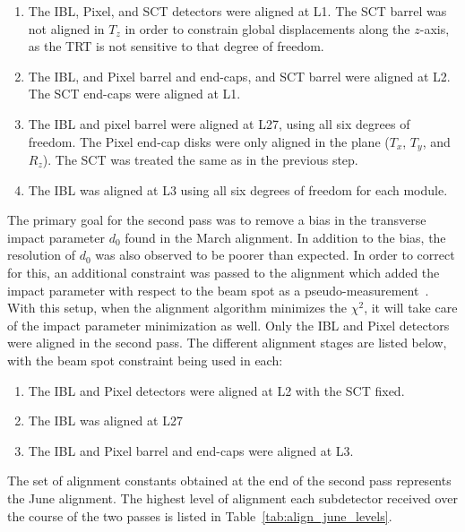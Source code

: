 \begin{enumerate}
\item The IBL, Pixel, and SCT detectors were aligned at L1.  The SCT barrel was not aligned in $T_z$ in order to constrain global displacements along the $z$-axis, as the TRT is not sensitive to that degree of freedom.
\item The IBL, and Pixel barrel and end-caps, and SCT barrel were aligned at L2.  The SCT end-caps were aligned at L1.
\item The IBL and pixel barrel were aligned at L27, using all six degrees of freedom.  The Pixel end-cap disks were only aligned in the plane ($T_x$, $T_y$, and $R_z$).  The SCT was treated the same as in the previous step.
\item The IBL was aligned at L3 using all six degrees of freedom for each module.
\end{enumerate}

The primary goal for the second pass was to remove a bias in the transverse impact parameter $d_0$ found in the March alignment.
In addition to the bias, the resolution of $d_0$ was also observed to be poorer than expected.
In order to correct for this, an additional constraint was passed to the alignment which added the impact parameter with respect to the beam spot as a pseudo-measurement~\cite{2014.alignment-framework}.
With this setup, when the alignment algorithm minimizes the $\chi^2$, it will take care of the impact parameter minimization as well.
Only the IBL and Pixel detectors were aligned in the second pass.
The different alignment stages are listed below, with the beam spot constraint being used in each:
\begin{enumerate}
\item The IBL and Pixel detectors were aligned at L2 with the SCT fixed.
\item The IBL was aligned at L27
\item The IBL and Pixel barrel and end-caps were aligned at L3.
\end{enumerate}
The set of alignment constants obtained at the end of the second pass represents the June alignment.
The highest level of alignment each subdetector received over the course of the two passes is listed in Table~\ref{tab:align_june_levels}.

